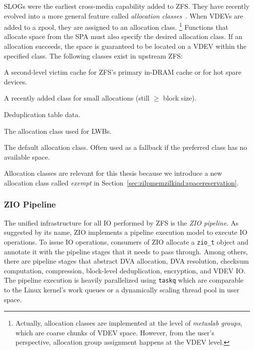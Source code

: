 \documentclass[12pt,a4paper,twoside]{book}
\begin{document}
SLOGs were the earliest cross-media capability added to ZFS.
They have recently evolved into a more general feature called \textit{allocation classes}~\cite{openzfsAllocationClasses}.
When VDEVs are added to a zpool, they are assigned to an allocation class.%
\footnote{
 Actually, allocation classes are implemented at the level of \textit{metaslab groups}, which are coarse chunks of VDEV space.
 However, from the user's perspective, allocation group assignment happens at the VDEV level.
}
Functions that allocate space from the SPA must also specify the desired allocation class.
If an allocation succeeds, the space is guaranteed to be located on a VDEV within the specified class.
The following classes exist in upstream ZFS:
\begin{description}[noitemsep,leftmargin=1.5cm,labelindent=1cm]
    \item[aux] A second-level victim cache for ZFS's primary in-DRAM cache or for hot spare devices.
    \item[special] A recently added class for small allocations (still $\ge$ block size).
    \item[dedup] Deduplication table data.
    \item[log] The allocation class used for LWBs.
    \item[normal] The default allocation class. Often used as a fallback if the preferred class has no available space.
\end{description}
Allocation classes are relevant for this thesis because we introduce a new allocation class called \textit{exempt} in Section~\ref{sec:zilpmemzilkind:spacereservation}.

\subsubsection{ZIO Pipeline}

The unified infrastructure for all IO performed by ZFS is the \textit{ZIO pipeline}.
As suggested by its name, ZIO implements a pipeline execution model to execute IO operations.
To issue IO operations, consumers of ZIO allocate a \lstinline{zio_t} object and annotate it with the pipeline stages that it needs to pass through.
Among others, there are pipeline stages that abstract DVA allocation, DVA resolution, checksum computation, compression, block-level deduplication, encryption, and VDEV IO.
The pipeline execution is heavily parallelized using \lstinline{taskq} which are comparable to the Linux kernel's work queues or a dynamically scaling thread pool in user space.
\end{document}
